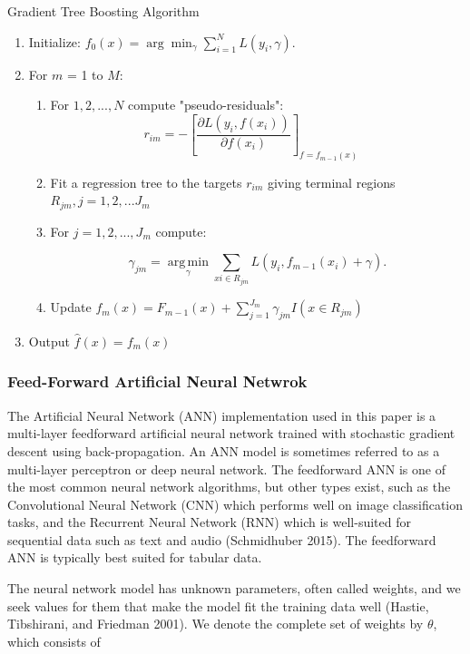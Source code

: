 \documentclass[12pt,]{article}
\begin{document}
\begin{algorithm}
  \caption{Gradient Tree Boosting Algorithm}\label{alg:GBMAlo}
\begin{enumerate}
\item Initialize: $f_0(x) = \arg\min_\gamma \sum_{i=1}^N L(y_i, \gamma).$
\item For $m$ = 1 to $M$:
  \begin{enumerate}
  \item For $1,2,...,N$ compute "pseudo-residuals":
  $$
   r_{im} = -\left[\frac{\partial L(y_i, f(x_i))}{\partial f(x_i)}\right]_{f=f_{m-1}(x)} \quad
  $$
  \item Fit a regression tree to the targets $r_{im}$ giving terminal regions $R_{jm}, j = 1,2,...J_m$
  \item For $j = 1,2,...,J_m$ compute:
  
  $$
  \gamma_{jm} = \underset{\gamma}{\operatorname{arg\,min}} \sum_{xi \in R_{jm}} L\left(y_i, f_{m-1}(x_i) + \gamma \right).
  $$
  \item Update $f_m(x) = F_{m-1}(x) + \sum_{j=1}^{J_m}\gamma_{jm}I(x \in R_{jm})$
  \end{enumerate}
\item Output $\hat{f}(x) = f_m(x)$
\end{enumerate}
\end{algorithm}

\hypertarget{feed-forward-artificial-neural-netwrok}{%
\subsubsection{Feed-Forward Artificial Neural
Netwrok}\label{feed-forward-artificial-neural-netwrok}}

The Artificial Neural Network (ANN) implementation used in this paper is
a multi-layer feedforward artificial neural network trained with
stochastic gradient descent using back-propagation. An ANN model is
sometimes referred to as a multi-layer perceptron or deep neural
network. The feedforward ANN is one of the most common neural network
algorithms, but other types exist, such as the Convolutional Neural
Network (CNN) which performs well on image classification tasks, and the
Recurrent Neural Network (RNN) which is well-suited for sequential data
such as text and audio (Schmidhuber 2015). The feedforward ANN is
typically best suited for tabular data.

The neural network model has unknown parameters, often called weights,
and we seek values for them that make the model fit the training data
well (Hastie, Tibshirani, and Friedman 2001). We denote the complete set
of weights by \(\theta\), which consists of
\end{document}
